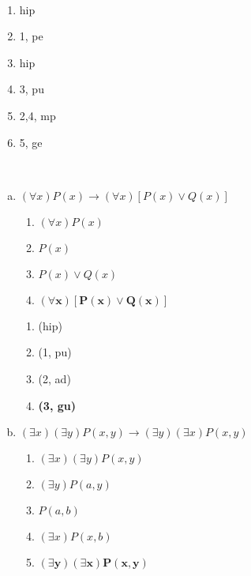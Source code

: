 \begin{Gabarito}{4}
~
    \begin{multicols}{2}
      \begin{enumerate}
        \item hip
        \item 1, pe
        \item hip
        \item 3, pu
        \item 2,4, mp
        \item 5, ge
      \end{enumerate}
    \end{multicols}
  
\end{Gabarito}
\begin{Gabarito}{5}
~

    \begin{enumerate}[a)]
      \item $(\forall x)P(x) \rightarrow (\forall x)[P(x) \lor Q(x)]$
            \begin{multicols}{2}

              \begin{enumerate}[1.]
                \item $(\forall x)P(x)$
                \item $P(x)$
                \item $P(x) \lor Q(x)$
                \item $\boldsymbol{(\forall x)[P(x) \lor Q(x)]}$
              \end{enumerate}

              \columnbreak

              \begin{enumerate}[\ding{32}]
                \item (hip)
                \item (1, pu)
                \item (2, ad)
                \item \textbf{(3, gu)}
              \end{enumerate}

            \end{multicols}

      \item $(\exists x)(\exists y)P(x, y) \rightarrow (\exists y)(\exists x)P(x, y)$
            \begin{multicols}{2}

              \begin{enumerate}[1.]
                \item $(\exists x)(\exists y)P(x, y)$
                \item $(\exists y)P(a,y)$
                \item $P(a,b)$
                \item $(\exists x)P(x,b)$
                \item $\boldsymbol{(\exists y)(\exists x)P(x, y)}$
              \end{enumerate}


\end{multicols}
\end{enumerate}
\end{Gabarito}
